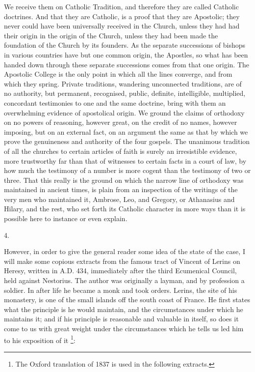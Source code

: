 We receive them on Catholic Tradition, and therefore they are
called Catholic doctrines. And that they are Catholic, is a proof that
they are Apostolic; they never could have been universally received in
the Church, unless they had had their origin in the origin of the
Church, unless they had been made the foundation of the Church by its
founders. As the separate successions of bishops in various countries
have but one common origin, the Apostles, so what has been handed down
through these separate successions comes from that one origin. The
Apostolic College is the only point in which all the lines converge,
and from which they spring. Private traditions, wandering unconnected
traditions, are of no authority, but permanent, recognised, public,
definite, intelligible, multiplied, concordant testimonies to one and
the same doctrine, bring with them an overwhelming evidence of
apostolical origin. We ground the claims of orthodoxy on no powers of
reasoning, however great, on the credit of no names, however imposing,
but on an external fact, on an argument the same as that by
which we prove the genuineness and authority of the four gospels. The
unanimous tradition of all the churches to certain articles of faith
is surely an irresistible evidence, more trustworthy far than that of
witnesses to certain facts in a court of law, by how much the
testimony of a number is more cogent than the testimony of two or
three. That this really is the ground on which the narrow line of
orthodoxy was maintained in ancient times, is plain from an inspection
of the writings of the very men who maintained it, Ambrose, Leo, and
Gregory, or Athanasius and Hilary, and the rest, who set forth its
Catholic character in more ways than it is possible here to instance
or even explain.

4.

However, in order to give the general reader some idea of the state
of the case, I will make some copious extracts from the famous tract
of Vincent of Lerins on Heresy, written in A.D.
434, immediately after the third Ecumenical Council, held against
Nestorius. The author was originally a layman, and by profession a
soldier. In after life he became a monk and took orders. Lerins, the
site of his monastery, is one of the small islands off the south coast
of France. He first states what the principle is he would maintain,
and the circumstances under which he maintains it; and if his
principle is reasonable and valuable in itself, so does it come to us
with great weight under the circumstances which he tells us led him to
his exposition of it \footnote{The Oxford translation of 1837 is used in the following
extracts.}:

